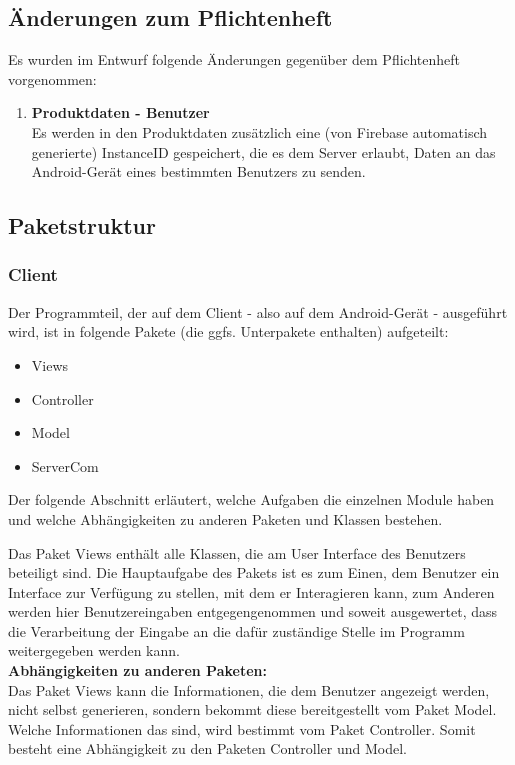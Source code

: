 



\subsection{Änderungen zum Pflichtenheft}

Es wurden im Entwurf folgende Änderungen gegenüber dem Pflichtenheft vorgenommen:
\begin{enumerate}
	\item \textbf{Produktdaten - Benutzer} \\
	Es werden in den Produktdaten zusätzlich eine (von Firebase automatisch generierte) InstanceID gespeichert, die es dem Server erlaubt, Daten an das Android-Gerät eines bestimmten Benutzers zu senden.
\end{enumerate}


\subsection{Paketstruktur}

\subsubsection{Client}
Der Programmteil, der auf dem Client - also auf dem Android-Gerät - ausgeführt wird, ist in folgende Pakete (die ggfs. Unterpakete enthalten) aufgeteilt:
\begin{itemize}
	\item Views
	\item Controller
	\item Model
	\item ServerCom
\end{itemize}

Der folgende Abschnitt erläutert, welche Aufgaben die einzelnen Module haben und welche Abhängigkeiten zu anderen Paketen und Klassen bestehen.

Das Paket Views enthält alle Klassen, die am User Interface des Benutzers beteiligt sind. Die Hauptaufgabe des Pakets ist es zum Einen, dem Benutzer ein Interface zur Verfügung zu stellen, mit dem er Interagieren kann, zum Anderen werden hier Benutzereingaben entgegengenommen und soweit ausgewertet, dass die Verarbeitung der Eingabe an die dafür zuständige Stelle im Programm weitergegeben werden kann.\\

\textbf{Abhängigkeiten zu anderen Paketen:}\\
Das Paket Views kann die Informationen, die dem Benutzer angezeigt werden, nicht selbst generieren, sondern bekommt diese bereitgestellt vom Paket Model. Welche Informationen das sind, wird bestimmt vom Paket Controller. Somit besteht eine Abhängigkeit zu den Paketen Controller und Model.\\

